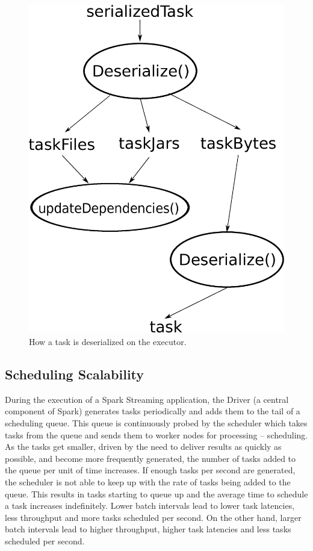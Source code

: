 \begin{figure}[t!]
  \begin{center}
    \includegraphics[scale=0.30]{deserialization.eps}
  \end{center}
  \caption{How a task is deserialized on the executor.}
  \label{fig:deserialization}
\end{figure}

\subsection{Scheduling Scalability}

During the execution of a Spark Streaming application, the Driver (a central component of Spark) generates tasks periodically and adds them to the tail of a scheduling queue. This queue is continuously probed by the scheduler which takes tasks from the queue and sends them to worker nodes for processing -- scheduling.
As the tasks get smaller, driven by the need to deliver results as quickly as possible, and become more frequently generated, the number of tasks added to the queue per unit of time increases. If enough tasks per second are generated, the scheduler is not able to keep up with the rate of tasks being added to the queue. This results in tasks starting to queue up and the average time to schedule a task increases indefinitely.
Lower batch intervals lead to lower task latencies, less throughput and more tasks scheduled per second. On the other hand, larger batch intervals lead to higher throughput, higher task latencies and less tasks scheduled per second. 

